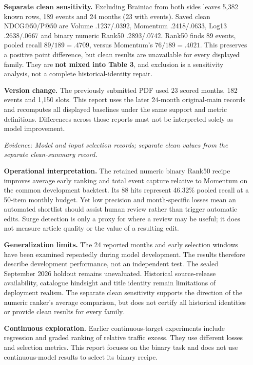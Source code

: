 \documentclass[11pt,letterpaper]{article}
\newcommand{\sect}[1]{\vspace{4pt}{\large\bfseries\color{teal}#1}\par}
\newcommand{\src}[1]{{\small\textit{Evidence: #1}}}
\begin{document}
\textbf{Separate clean sensitivity.} Excluding Brainiac from both sides leaves 5,382 known rows, 189 events and 24 months (23 with events). Saved clean NDCG@50/P@50 are Volume .1237/.0392, Momentum .2418/.0633, Log13 .2638/.0667 and binary numeric Rank50 .2893/.0742. Rank50 finds 89 events, pooled recall $89/189=.4709$, versus Momentum's $76/189=.4021$. This preserves a positive point difference, but clean results are unavailable for every displayed family. They are \textbf{not mixed into Table 3}, and exclusion is a sensitivity analysis, not a complete historical-identity repair.

\textbf{Version change.} The previously submitted PDF used 23 scored months, 182 events and 1,150 slots. This report uses the later 24-month original-main records and recomputes all displayed baselines under the same support and metric definitions. Differences across those reports must not be interpreted solely as model improvement.

\src{Model and input selection records; separate clean values from the separate clean-summary record.}

\newpage
\sect{10. Interpretation and reproducibility}
\textbf{Operational interpretation.} The retained numeric binary Rank50 recipe improves average early ranking and total event capture relative to Momentum on the common development backtest. Its 88 hits represent 46.32\% pooled recall at a 50-item monthly budget. Yet low precision and month-specific losses mean an automated shortlist should assist human review rather than trigger automatic edits. Surge detection is only a proxy for where a review may be useful; it does not measure article quality or the value of a resulting edit.

\textbf{Generalization limits.} The 24 reported months and early selection windows have been examined repeatedly during model development. The results therefore describe development performance, not an independent test. The sealed September 2026 holdout remains unevaluated. Historical source-release availability, catalogue hindsight and title identity remain limitations of deployment realism. The separate clean sensitivity supports the direction of the numeric ranker's average comparison, but does not certify all historical identities or provide clean results for every family.

\textbf{Continuous exploration.} Earlier continuous-target experiments include regression and graded ranking of relative traffic excess. They use different losses and selection metrics. This report focuses on the binary task and does not use continuous-model results to select its binary recipe.
\end{document}
